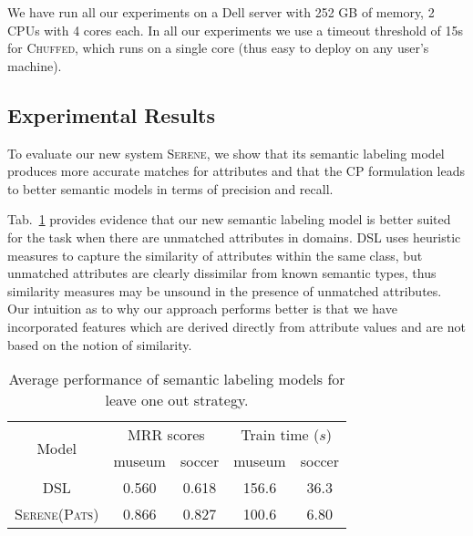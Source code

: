 \documentclass[letterpaper]{article} %
\newcommand{\authornote}[3]{
  {\fbox{\sc 
  #1}:$\blacktriangleright$\textcolor{#2}{\small{#3}}$\blacktriangleleft$}%
}
\newcommand{\npr}[1]{\authornote{NPR}{orange}{#1}}
\newcommand{\chuffed}{\textsc{Chuffed}}
\newcommand{\serene}{\textsc{Serene}}
\newcommand{\ignore}[1]{}
\begin{document}
We have run all our experiments on a Dell server with 252 GB of memory, 2 CPUs 
with 4 cores each.
In all our experiments we use a timeout threshold of 15s for \chuffed{}, which 
runs on a single core (thus easy to deploy on any user's machine).

\subsection{Experimental Results}

To evaluate our new system \serene{}, we show that its semantic labeling model 
produces more accurate matches for attributes and that the CP formulation leads 
to better semantic models in terms of precision and recall.

\ignore{We have developed a new approach for semantic labeling which can 
efficiently handle the \emph{unknown} class.}
\ignore{We demonstrate its efficiency by comparing against the state-of-the-art 
approach DSL~\cite{Pham:semantic}. } %
Tab.~\ref{tab:semlab} provides evidence that our new semantic labeling model is better suited for the task when there are unmatched attributes in domains.
DSL uses heuristic measures to capture the similarity of attributes within the same class, but 
unmatched attributes are clearly dissimilar from known semantic types, thus similarity measures may be unsound in the presence of unmatched attributes.
Our intuition as to why our approach performs better is that we have 
incorporated features which are derived directly from attribute values and are 
not based on the notion of similarity.

\begin{table}[!ht]\small
  \centering
  \caption{Average performance of semantic labeling models for leave one out strategy.}
  	\label{tab:semlab}
  	\begin{tabular}{c|cc|cc} 
  		\hline
  		\multirow{2}{*}{Model} & \multicolumn{2}{c|}{MRR scores} & 
  		\multicolumn{2}{c}{Train time ($s$)}\\
  		 & museum & soccer & museum & soccer\\
  		\hline
  		DSL & 0.560 & 0.618 & 156.6 & 36.3\\
 		\textsc{Serene(Pats)} & 0.866 & 0.827 & 100.6 & 6.80\\
  		\hline
		\end{tabular} 
\end{table}
\end{document}

